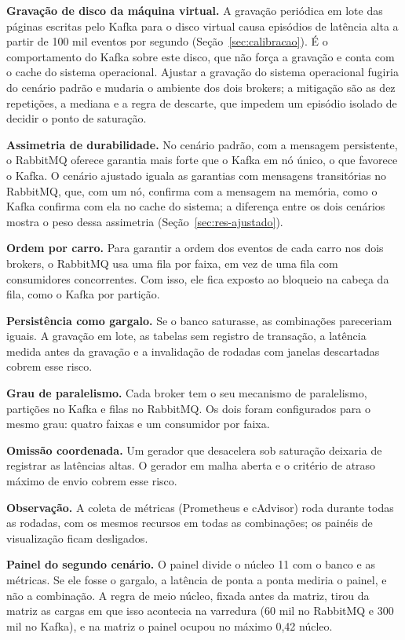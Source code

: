 \documentclass[12pt]{article}
\begin{document}
\textbf{Gravação de disco da máquina virtual.} A gravação periódica em lote das páginas
escritas pelo Kafka para o disco virtual causa episódios de latência alta a partir de 100
mil eventos por segundo (Seção~\ref{sec:calibracao}). É o comportamento do Kafka sobre
este disco, que não força a gravação e conta com o cache do sistema operacional. Ajustar
a gravação do sistema operacional fugiria do cenário padrão e mudaria o ambiente dos dois
brokers; a mitigação são as dez repetições, a mediana e a regra de descarte, que impedem
um episódio isolado de decidir o ponto de saturação.

\textbf{Assimetria de durabilidade.} No cenário padrão, com a mensagem persistente, o
RabbitMQ oferece garantia mais forte que o Kafka em nó único, o que favorece o Kafka. O
cenário ajustado iguala as garantias com mensagens transitórias no RabbitMQ, que, com um
nó, confirma com a mensagem na memória, como o Kafka confirma com ela no cache do sistema;
a diferença entre os dois cenários mostra o peso dessa assimetria
(Seção~\ref{sec:res-ajustado}).

\textbf{Ordem por carro.} Para garantir a ordem dos eventos de cada carro nos dois
brokers, o RabbitMQ usa uma fila por faixa, em vez de uma fila com consumidores
concorrentes. Com isso, ele fica exposto ao bloqueio na cabeça da fila, como o Kafka por
partição.

\textbf{Persistência como gargalo.} Se o banco saturasse, as combinações pareceriam
iguais. A gravação em lote, as tabelas sem registro de transação, a latência medida antes
da gravação e a invalidação de rodadas com janelas descartadas cobrem esse risco.

\textbf{Grau de paralelismo.} Cada broker tem o seu mecanismo de paralelismo, partições
no Kafka e filas no RabbitMQ. Os dois foram configurados para o mesmo grau: quatro
faixas e um consumidor por faixa.

\textbf{Omissão coordenada.} Um gerador que desacelera sob saturação deixaria de
registrar as latências altas. O gerador em malha aberta e o critério de atraso máximo de
envio cobrem esse risco.

\textbf{Observação.} A coleta de métricas (Prometheus e cAdvisor) roda durante todas as
rodadas, com os mesmos recursos em todas as combinações; os painéis de visualização
ficam desligados.

\textbf{Painel do segundo cenário.} O painel divide o núcleo 11 com o banco e as
métricas. Se ele fosse o gargalo, a latência de ponta a ponta mediria o painel, e não a
combinação. A regra de meio núcleo, fixada antes da matriz, tirou da matriz as cargas
em que isso acontecia na varredura (60 mil no RabbitMQ e 300 mil no Kafka), e na
matriz o painel ocupou no máximo 0,42 núcleo.
\end{document}
